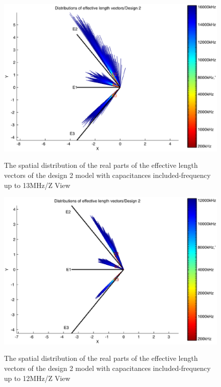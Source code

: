 \documentclass[a4paper,14pt]{extbook}
\begin{document}
\begin{figure}
\begin{center}
\includegraphics[scale=0.65]{HeffVerteilungD2-ZView_caps2.eps} \\
\caption{The spatial distribution of the real parts of the effective length vectors of the design 2 model with capacitances included-frequency up to 13MHz/Z View }\label{fig_heff_dist_D2_A_Z_View_caps2}
\end{center}
\end{figure}

\begin{figure}
\begin{center}
\includegraphics[scale=0.65]{HeffVerteilungD2-ZView_caps3.eps} \\
\caption{The spatial distribution of the real parts of the effective length vectors of the design 2 model with capacitances included-frequency up to 12MHz/Z View }\label{fig_heff_dist_D2_A_Z_View_caps3}
\end{center}
\end{figure}
\end{document}
